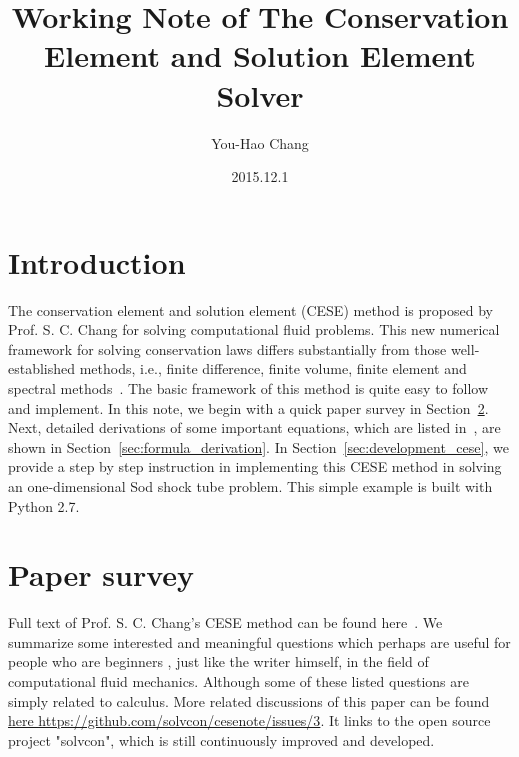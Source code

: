 \documentclass[a4paper,12pt,dvips]{article}
\begin{document}
\title{Working Note of The Conservation Element and Solution Element Solver}
\author{You-Hao Chang}
\date{2015.12.1}

\maketitle

\tableofcontents

\hspace{.5cm}
\newpage

\section{Introduction}
 \label{sec:introduction}
The conservation element and solution element (CESE) method is proposed by
Prof. S. C. Chang for solving computational fluid problems. This new numerical
framework for solving conservation laws differs substantially from those
well-established methods, i.e., finite difference, finite volume, finite 
element and spectral methods~\cite{CESE_Shin_Chung_Chang_1995}. The basic 
framework of this method is quite easy to follow and implement. In this note, 
we begin with a quick paper survey in Section~\ref{sec:paper_survey}. Next, 
detailed derivations of some important equations, which are listed 
in~\cite{CESE_Shin_Chung_Chang_1995}, are shown in 
Section~\ref{sec:formula_derivation}. In Section~\ref{sec:development_cese}, 
we provide a step by step instruction in implementing this CESE method in 
solving an one-dimensional Sod shock tube problem. This simple example is built
 with Python 2.7. 

\section{Paper survey}
 \label{sec:paper_survey}
Full text of Prof. S. C. Chang's CESE method can be found
here~\cite{CESE_Shin_Chung_Chang_1995}. We summarize some interested and
meaningful questions which perhaps are useful for people who are beginners 
, just like the writer himself, in the field of computational fluid mechanics. 
Although some of these listed questions are simply related to calculus. 
More related discussions of this paper can be found
\href{https://github.com/solvcon/cesenote/issues/3}
{here https://github.com/solvcon/cesenote/issues/3}. It links to the open 
source project "solvcon", which is still continuously improved and developed.
\end{document}
